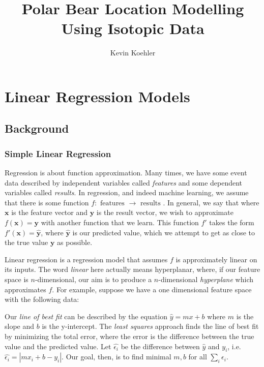 \documentclass[a4paper,english]{article}
\title{Polar Bear Location Modelling Using Isotopic Data}
\author{Kevin Koehler}
\date{}
\begin{document}
\maketitle

\section{Linear Regression Models}

\subsection{Background}

\subsubsection{Simple Linear Regression}
Regression is about function approximation. Many times, we have some event data described by independent variables called \textit{features} and some dependent variables called \textit{results}. In regression, and indeed machine learning, we assume that there is some function $f: \text{ features } \to \text{ results }$. In general, we say that where $\textbf{x}$ is the feature vector and $\textbf{y}$ is the result vector, we wish to approximate $f(\textbf{x})=\textbf{y}$ with another function that we learn. This function $f'$ takes the form $f'(\textbf{x}) = \hat{\textbf{y}}$, where $\hat{\textbf{y}}$ is our predicted value, which we attempt to get as close to the true value $\textbf{y}$ as possible.

Linear regression is a regression model that assumes $f$ is approximately linear on its inputs. The word \textit{linear} here actually means hyperplanar, where, if our feature space is $n$-dimensional, our aim is to produce a $n$-dimensional \textit{hyperplane} which approximates $f$. For example, suppose we have a one dimensional feature space with the following data:\\


Our \textit{line of best fit} can be described by the equation $\hat{y} = mx + b$ where $m$ is the slope and $b$ is the y-intercept. The \textit{least squares} approach finds the line of best fit by minimizing the total error, where the error is the difference between the true value and the predicted value. Let $\hat{\epsilon_i}$ be the difference between $\hat{y}$ and $y_i$, i.e. $\hat{\epsilon_i} = | mx_i + b - y_i |$. Our goal, then, is to find minimal $m,b$ for all $\sum_{i}\epsilon_i$. 
\end{document}
